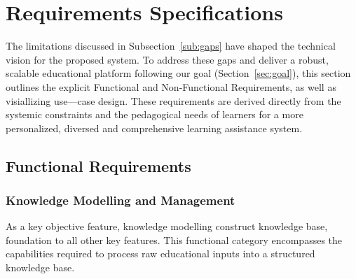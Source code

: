 \chapter{Requirements Specifications}\label{chap:req}

The limitations discussed in Subsection~\ref{sub:gaps} have shaped the technical vision for the proposed system. To address these gaps and deliver a robust, 
scalable educational platform following our goal (Section~\ref{sec:goal}), this section outlines the explicit Functional and Non-Functional Requirements, as well as 
visiallizing use---case design. These requirements are derived directly from the systemic constraints and the pedagogical needs of learners for a more personalized, 
diversed and comprehensive learning assistance system.

\section{Functional Requirements}\label{sec:fun}

\subsection{Knowledge Modelling and Management}
As a key objective feature, knowledge modelling construct knowledge base, foundation to all other key features. This functional category encompasses the capabilities 
required to process raw educational inputs into a structured knowledge base.

